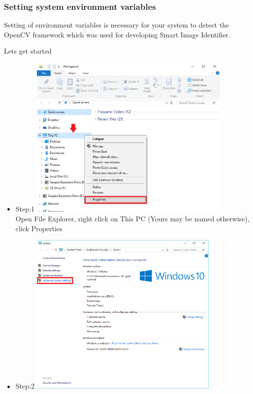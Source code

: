 \documentclass[a4paper,12pt]{report}
\begin{document}
	\subsubsection{Setting system environment variables}
	Setting of environment variables is necessary for your system to detect the OpenCV framework
	which was used for developing Smart Image Identifier.
	
	\newpage
	Lets get started
	
	\begin{itemize}
		\item Step:1	\linebreak
		\includegraphics[height=8cm]{../Images/001.png}\\
		\linebreak
		Open File Explorer, right click on This PC (Yours may be named otherwise), click Properties
		\item Step:2	\linebreak
		\includegraphics[height=8cm]{../Images/002.png}\\ 
		\linebreak 

\end{itemize}
\end{document}
